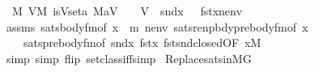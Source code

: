 \begin{isabellebody}
\ \ {\isacharparenleft}{\kern0pt}{\isasymexists}{\isasymtau}{\isasymin}M{\isachardot}{\kern0pt}\ {\isasymexists}V{\isasymin}M{\isachardot}{\kern0pt}\ is{\isacharunderscore}{\kern0pt}Vset{\isacharparenleft}{\kern0pt}{\isasymlambda}a{\isachardot}{\kern0pt}\ {\isacharparenleft}{\kern0pt}{\isacharhash}{\kern0pt}{\isacharhash}{\kern0pt}M{\isacharparenright}{\kern0pt}{\isacharparenleft}{\kern0pt}a{\isacharparenright}{\kern0pt}{\isacharcomma}{\kern0pt}{\isasymalpha}{\isacharcomma}{\kern0pt}V{\isacharparenright}{\kern0pt}\ {\isasymand}\ {\isasymtau}\ {\isasymin}\ V\ {\isasymand}\ {\isacharparenleft}{\kern0pt}snd{\isacharparenleft}{\kern0pt}x{\isacharparenright}{\kern0pt}\ {\isasymtturnstile}\ {\isasymphi}\ {\isacharparenleft}{\kern0pt}{\isacharbrackleft}{\kern0pt}fst{\isacharparenleft}{\kern0pt}x{\isacharparenright}{\kern0pt}{\isacharcomma}{\kern0pt}{\isasymtau}{\isacharbrackright}{\kern0pt}{\isacharat}{\kern0pt}nenv{\isacharparenright}{\kern0pt}{\isacharparenright}{\kern0pt}{\isacharparenright}{\kern0pt}{\isachardoublequoteclose}\isanewline
%
\isadelimproof
\ \ %
\endisadelimproof
%
\isatagproof
{}\isamarkupfalse%
\ assms\ sats{\isacharunderscore}{\kern0pt}body{\isacharunderscore}{\kern0pt}fm{\isacharbrackleft}{\kern0pt}of\ x\ {\isasymalpha}\ m\ nenv{\isacharbrackright}{\kern0pt}\ sats{\isacharunderscore}{\kern0pt}renpbdy{\isacharunderscore}{\kern0pt}prebody{\isacharunderscore}{\kern0pt}fm{\isacharbrackleft}{\kern0pt}of\ x\ {\isasymalpha}{\isacharbrackright}{\kern0pt}\isanewline
\ \ \ \ sats{\isacharunderscore}{\kern0pt}prebody{\isacharunderscore}{\kern0pt}fm{\isacharbrackleft}{\kern0pt}of\ {\isachardoublequoteopen}snd{\isacharparenleft}{\kern0pt}x{\isacharparenright}{\kern0pt}{\isachardoublequoteclose}\ {\isachardoublequoteopen}fst{\isacharparenleft}{\kern0pt}x{\isacharparenright}{\kern0pt}{\isachardoublequoteclose}{\isacharbrackright}{\kern0pt}\ fst{\isacharunderscore}{\kern0pt}snd{\isacharunderscore}{\kern0pt}closed{\isacharbrackleft}{\kern0pt}OF\ {\isacartoucheopen}x{\isasymin}M{\isacartoucheclose}{\isacharbrackright}{\kern0pt}\isanewline
\ \ \isamarkupfalse%
\ {\isacharparenleft}{\kern0pt}simp{\isacharcomma}{\kern0pt}\ simp\ flip{\isacharcolon}{\kern0pt}\ setclass{\isacharunderscore}{\kern0pt}iff{\isacharcomma}{\kern0pt}simp{\isacharparenright}{\kern0pt}%
\endisatagproof
{\isafoldproof}%
%
\isadelimproof
\isanewline
%
\endisadelimproof
\isanewline
{}\isamarkupfalse%
\ Replace{\isacharunderscore}{\kern0pt}sats{\isacharunderscore}{\kern0pt}in{\isacharunderscore}{\kern0pt}MG{\isacharcolon}{\kern0pt}\isanewline
\ \ \isanewline

\end{isabellebody}
